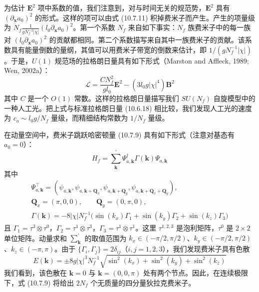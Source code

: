 为估计 $\pmb E^{2}$ 项中系数的值，我们注意到，对与时间无关的规范势，$\pmb E^{2}$ 具有 $(\partial_{\pmb x}a_0)^{2}$ 的形式。这样的项可以由式 (10.7.11) 积掉费米子而产生。产生的项量级为 $N_f\frac{1}{gN_f^{-1}|\chi|}(l_0\partial_{\pmb x}a_0)^{2}$。第一个系数 $N_f$ 来自如下事实：$N_f$ 族费米子中的每一族对 $(l_0\partial_{\pmb x}a_0)^{2}$ 的贡献都相同。第二个系数描写来自其中一族费米子的贡献。该系数具有能量倒数的量纲，其值可以用费米子带宽的倒数来估计，即 $1/(gN_f^{-1}|\chi|)$。于是，$U(1)$ 规范场的拉格朗日量具有如下形式（Marston and Affleck, 1989; Wen, 2002a）：
\begin{equation*}
\mathcal L=\frac{CN_f^{2}}{gl_0}\pmb E^{2}-(3l_0g|\chi|^{4})\pmb B^{2}
\end{equation*}
其中 $C$ 是一个 $O(1)$ 常数。这样的拉格朗日量描写我们 $SU(N_f)$ 自旋模型中的一种人工光。把上式与标准拉格朗日量 (10.6.18) 相比较，我们发现人工光的速度为 $c_a\sim l_0g/N_f$ 量级，而精细结构常数为 $1/N_f$ 量级。

在动量空间中，费米子跳跃哈密顿量 (10.7.9) 具有如下形式（注意对基态有 $a_0=0$）：
\begin{equation*}
H_f=\sum_{\pmb k}^{\prime}\Psi^{\dagger}_{a,\pmb k}\Gamma(\pmb k)\Psi_{a,\pmb k}
\end{equation*}
其中
\begin{gather*}
\Psi^{\top}_{a,\pmb k}=(\psi_{a,\pmb k},\psi_{a,\pmb k+\pmb Q_x},\psi_{a,\pmb k+\pmb Q_y},\psi_{a,\pmb k+\pmb Q_x+\pmb Q_y}),\\
\pmb Q_x=(\pi,0,0),\qquad \pmb Q_y=(0,\pi,0),\\
\Gamma(\pmb k)=-8|\chi|N_f^{-1}\big(\sin(k_x)\Gamma_1+\sin(k_y)\Gamma_2+\sin(k_z)\Gamma_3\big)\tag{10.7.12}
\end{gather*}
且 $\Gamma_1=\tau^{3}\otimes\tau^{0}$，$\Gamma_2=\tau^{1}\otimes\tau^{3}$，$\Gamma_3=\tau^{1}\otimes\tau^{1}$。这里 $\tau^{1,2,3}$ 是泡利矩阵，$\tau^{0}$ 是 $2\times2$ 单位矩阵。动量求和 $\sum_{\pmb k}^{\prime}$ 的取值范围为 $k_x\in(-\pi/2,\pi/2)$、$k_y\in(-\pi/2,\pi/2)$、$k_z\in(-\pi,\pi)$。由于 $\{\Gamma_i,\Gamma_j\}=2\delta_{ij}$（$i,j=1,2,3$），我们发现费米子具有色散
\begin{equation*}
E(\pmb k)=\pm8g|\chi|^{3}N_f^{-1}\sqrt{\sin^{2}(k_x)+\sin^{2}(k_y)+\sin^{2}(k_z)}
\end{equation*}
我们看到，该色散在 $\pmb k=0$ 与 $\pmb k=(0,0,\pi)$ 处有两个节点。因此，在连续极限下，式 (10.7.9) 将给出 $2N_f$ 个无质量的四分量狄拉克费米子。

